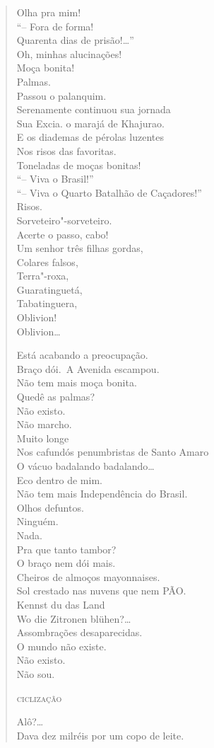 \begin{verse}
Olha pra mim!\\
``-- Fora de forma!\\
Quarenta dias de prisão!\ldots{}''\\
Oh, minhas alucinações!\\
Moça bonita!\\
Palmas.\\
Passou o palanquim.\\
Serenamente continuou sua jornada\\
Sua Excia. o marajá de Khajurao.\\
E os diademas de pérolas luzentes\\
Nos risos das favoritas.\\
Toneladas de moças bonitas!\\
``-- Viva o Brasil!''\\
``-- Viva o Quarto Batalhão de Caçadores!''\\
Risos.\\
Sorveteiro"-sorveteiro.\\
Acerte o passo, cabo!\\
Um senhor três filhas gordas,\\
Colares falsos,\\
Terra"-roxa,\\
Guaratinguetá,\\
Tabatinguera,\\
Oblivion!\\
Oblivion\ldots{}

Está acabando a preocupação.\\
Braço dói.\
A Avenida escampou.\\
Não tem mais moça bonita.\\
Quedê as palmas?\\
Não existo.\\
Não marcho.\\
Muito longe\\
Nos cafundós penumbristas de Santo Amaro\\
O vácuo badalando badalando\ldots{}\\
Eco dentro de mim.\\
Não tem mais Independência do Brasil.\\
Olhos defuntos.\\
Ninguém.\\
Nada.\\
Pra que tanto tambor?\\
O braço nem dói mais.\\
Cheiros de almoços mayonnaises.\\
Sol crestado nas nuvens que nem PÃO.\\
Kennst du das Land\\
Wo die Zitronen blühen?\ldots{}\\
Assombrações desaparecidas.\\
O mundo não existe.\\
Não existo.\\
Não sou.

\textsc{ciclização}

Alô?\ldots{}\\
Dava dez milréis por um copo de leite.
\end{verse}

